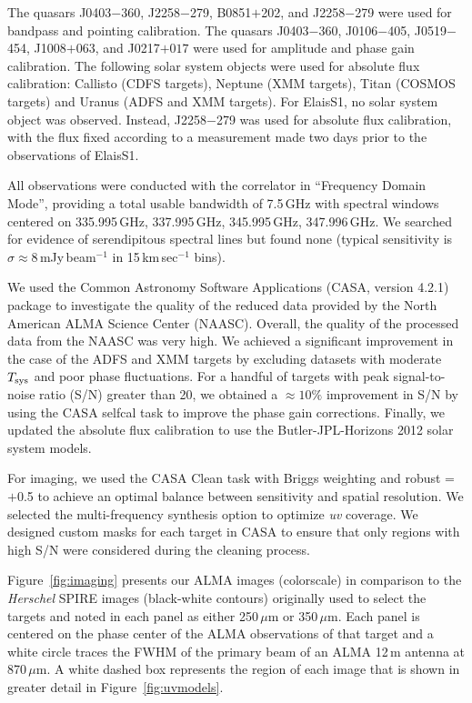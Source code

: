\documentclass[iop]{emulateapj}
\begin{document}
The quasars J0403$-$360, J2258$-$279, B0851$+$202, and J2258$-$279 were used
for bandpass and pointing calibration.  The quasars J0403$-$360, J0106$-$405,
J0519$-$454, J1008$+$063, and J0217$+017$ were used for amplitude and phase
gain calibration.  The following solar system objects were used for absolute
flux calibration: Callisto (CDFS targets), Neptune (XMM targets), Titan (COSMOS
targets) and Uranus (ADFS and XMM targets).  For ElaisS1, no solar system
object was observed.  Instead, J2258$-$279 was used for absolute flux
calibration, with the flux fixed according to a measurement made two days prior
to the observations of ElaisS1.

All observations were conducted with the correlator in ``Frequency Domain
Mode'', providing a total usable bandwidth of 7.5$\,$GHz with spectral windows
centered on 335.995$\,$GHz, 337.995$\,$GHz, 345.995$\,$GHz, 347.996$\,$GHz.  We
searched for evidence of serendipitous spectral lines but found none (typical
sensitivity is $\sigma \approx 8\,$mJy$\,$beam$^{-1}$ in 15$\,$km$\,$sec$^{-1}$
bins).

We used the Common Astronomy Software Applications (CASA, version 4.2.1)
package to investigate the quality of the reduced data provided by the North
American ALMA Science Center (NAASC).  Overall, the quality of the processed
data from the NAASC was very high.  We achieved a significant improvement in
the case of the ADFS and XMM targets by excluding datasets with moderate
$T_{\rm sys}$ and poor phase fluctuations.  For a handful of targets with peak
signal-to-noise ratio (S/N) greater than 20, we obtained a $\approx 10\%$
improvement in S/N by using the CASA {\sc selfcal} task to improve the phase
gain corrections.  Finally, we updated the absolute flux calibration to use the
Butler-JPL-Horizons 2012 solar system models.

For imaging, we used the CASA {\sc Clean} task with Briggs weighting and robust
= $+$0.5 to achieve an optimal balance between sensitivity and spatial
resolution.  We selected the multi-frequency synthesis option to optimize {\it
uv} coverage.  We designed custom masks for each target in CASA to ensure that
only regions with high S/N were considered during the cleaning process.

Figure~\ref{fig:imaging} presents our ALMA images (colorscale) in comparison to
the {\it Herschel} SPIRE images (black-white contours) originally used to
select the targets and noted in each panel as either 250$\,\mu$m or
350$\,\mu$m.  Each panel is centered on the phase center of the ALMA
observations of that target and a white circle traces the FWHM of the primary
beam of an ALMA 12$\,$m antenna at 870$\,\mu$m.  A white dashed box represents
the region of each image that is shown in greater detail in
Figure~\ref{fig:uvmodels}.
\end{document}

